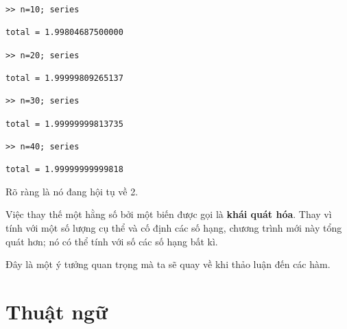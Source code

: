\documentclass[12pt]{book}
\begin{document}
\begin{verbatim}
>> n=10; series

total = 1.99804687500000

>> n=20; series

total = 1.99999809265137

>> n=30; series

total = 1.99999999813735

>> n=40; series

total = 1.99999999999818
\end{verbatim}
%
Rõ ràng là nó đang hội tụ về 2.

Việc thay thế một hằng số bởi một biến được gọi là 
{\bf khái quát hóa}. Thay vì tính với một số lượng cụ thể 
và cố định các số hạng, chương trình mới này tổng quát hơn;
nó có thể tính với số các số hạng bất kì.

Đây là một ý tưởng quan trọng mà ta sẽ quay về khi thảo luận
đến các hàm.


\section{Thuật ngữ}
\end{document}
